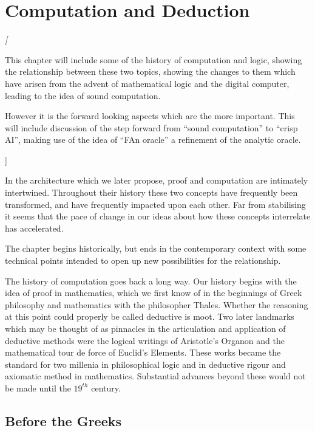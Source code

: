
\chapter{Computation and Deduction}\label{ComputationAndDeduction}

{\it[

This chapter will include some of the history of computation and logic,
showing the relationship between these two topics, showing the
changes to them which have arisen from the advent of mathematical
logic and the digital computer, leading to the idea of sound
computation. 

However it is the forward looking aspects which are the more important.
This will include discussion of the step forward from ``sound
computation'' to ``crisp AI'', making use of the idea of ``FAn
oracle'' a refinement of the analytic oracle.

]}

In the architecture which we later propose, proof and computation are
intimately intertwined.
Throughout their history these two concepts have frequently been
transformed, and have frequently impacted upon each other.
Far from stabilising it seems that the pace of change in our ideas
about how these concepts interrelate has accelerated.

The chapter begins historically, but ends in the contemporary context
with some technical points intended to open up new possibilities for the relationship.

The history of computation goes back a long way.
Our history begins with the idea of proof in mathematics, which we
first know of in the beginnings of Greek philosophy and mathematics
with the philosopher Thales.
Whether the reasoning at this point could properly be called deductive
is moot.
Two later landmarks which may be thought of as pinnacles in the
articulation and application of deductive methods were the logical
writings of Aristotle's Organon and the mathematical tour de force of Euclid's
Elements.
These works became the standard for two millenia in philosophical
logic and in deductive rigour and axiomatic method in mathematics.
Substantial advances beyond these would not be made until the
$19^{th}$ century.


\section{Before the Greeks}

